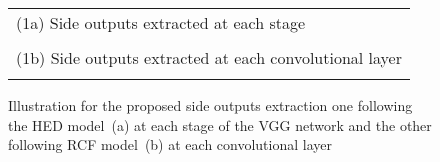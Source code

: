 \begin{figure}[htb]
\begin{center}
\begin{tabular}{l}
(1a) Side outputs extracted at each stage\\
\\
(1b) Side outputs extracted at each convolutional layer\\
\\
\end{tabular}%
\caption{Illustration for  the proposed side outputs extraction one following the HED model~(a) at each stage of the VGG network and the other following RCF model~(b) at each convolutional layer}
\end{center}
\label{fig:methods}
\end{figure}


%

